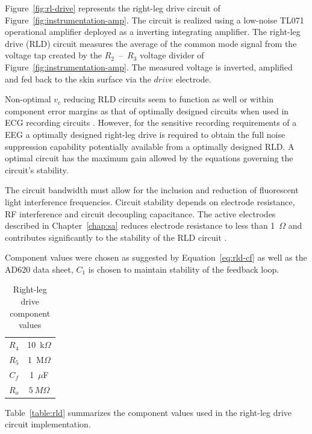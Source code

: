 Figure~\vref{fig:rl-drive} represents the right-leg drive circuit of
Figure~\ref{fig:instrumentation-amp}. The circuit is realized using a
low-noise TL071 operational amplifier deployed as a inverting
integrating amplifier. The right-leg drive (RLD) circuit measures the
average of the common mode signal from the voltage tap created by the
$R_2$~--~$R_3$ voltage divider of
Figure~\vref{fig:instrumentation-amp}. The measured voltage is
inverted, amplified and fed back to the skin surface via the $drive$
electrode.

Non-optimal $v_c$ reducing RLD circuits seem to function as well or
within component error margins as that of optimally designed circuits
when used in ECG recording circuits \cite{drive}. However, for the
sensitive recording requirements of a EEG a optimally designed
right-leg drive is required to obtain the full noise suppression
capability potentially available from a optimally designed RLD. A
optimal circuit has the maximum gain allowed by the equations
governing the circuit's stability. 

The circuit bandwidth must allow for the inclusion and reduction of
fluorescent light interference frequencies. Circuit stability depends
on electrode resistance, RF interference and circuit decoupling
capacitance. The active electrodes described in Chapter~\ref{chap:sa}
reduces electrode resistance to less than 1~$\Omega$ and contributes
significantly to the stability of the RLD circuit \cite{drive}.


Component values were chosen as suggested by Equation~\ref{eq:rld-cf}
as well as the AD620 data sheet, $C_1$ is chosen to maintain stability
of the feedback loop.

\begin{table}
\begin{center}	
	\begin{tabular}[htpb]{|c|c|} \hline
	$R_4$ & 10~k$\Omega$ \\
	$R_5$ & 1~M$\Omega$ \\
	$C_f$ & 1~$\mu$F \\
	$R_o$ & $5~M\Omega$\\
	\hline
	\end{tabular}
	\caption{Right-leg drive component values}
	\label{table:rld}
\end{center}	
\end{table}

Table~\vref{table:rld} summarizes the component values used in the
right-leg drive circuit implementation.




